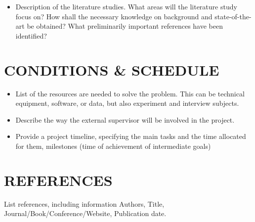 \documentclass[11pt]{article}
\begin{document}
\begin{itemize}[leftmargin=*, label={}]
  \item Description of the literature studies. What areas will the literature study focus on? How shall the necessary knowledge on background and state-of-the-art be obtained? What preliminarily important references have been identified?
\end{itemize}

\section*{CONDITIONS \& SCHEDULE}

\begin{itemize}[leftmargin=*, label={}]
  \item List of the resources are needed to solve the problem. This can be technical equipment, software, or data, but also experiment and interview subjects.
  \item Describe the way the external supervisor will be involved in the project.
  \item Provide a project timeline, specifying the main tasks and the time allocated for them, milestones (time of achievement of intermediate goals)
\end{itemize}

\section*{REFERENCES}

List references, including information Authors, Title, Journal/Book/Conference/Website, Publication date.
\end{document}
